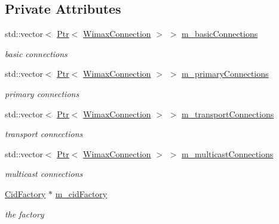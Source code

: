 \subsection*{Private Attributes}
\begin{DoxyCompactItemize}
\item 
std\+::vector$<$ \hyperlink{classns3_1_1Ptr}{Ptr}$<$ \hyperlink{classns3_1_1WimaxConnection}{Wimax\+Connection} $>$ $>$ \hyperlink{classns3_1_1ConnectionManager_a0f81554a9cd0f8c0de8502934a183a4f}{m\+\_\+basic\+Connections}
\begin{DoxyCompactList}\small\item\em basic connections \end{DoxyCompactList}\item 
std\+::vector$<$ \hyperlink{classns3_1_1Ptr}{Ptr}$<$ \hyperlink{classns3_1_1WimaxConnection}{Wimax\+Connection} $>$ $>$ \hyperlink{classns3_1_1ConnectionManager_a0cb92894d44165904581b248f7da763c}{m\+\_\+primary\+Connections}
\begin{DoxyCompactList}\small\item\em primary connections \end{DoxyCompactList}\item 
std\+::vector$<$ \hyperlink{classns3_1_1Ptr}{Ptr}$<$ \hyperlink{classns3_1_1WimaxConnection}{Wimax\+Connection} $>$ $>$ \hyperlink{classns3_1_1ConnectionManager_a78fdb78f7e511846b77f18a9b3959f71}{m\+\_\+transport\+Connections}
\begin{DoxyCompactList}\small\item\em transport connections \end{DoxyCompactList}\item 
std\+::vector$<$ \hyperlink{classns3_1_1Ptr}{Ptr}$<$ \hyperlink{classns3_1_1WimaxConnection}{Wimax\+Connection} $>$ $>$ \hyperlink{classns3_1_1ConnectionManager_aff5360d9edcfe9f6c5d1d04d2e2675f1}{m\+\_\+multicast\+Connections}
\begin{DoxyCompactList}\small\item\em multicast connections \end{DoxyCompactList}\item 
\hyperlink{classns3_1_1CidFactory}{Cid\+Factory} $\ast$ \hyperlink{classns3_1_1ConnectionManager_afe6ce81283bd4b9cba3545fd8f799c2b}{m\+\_\+cid\+Factory}
\begin{DoxyCompactList}\small\item\em the factory \end{DoxyCompactList}\end{DoxyCompactItemize}

